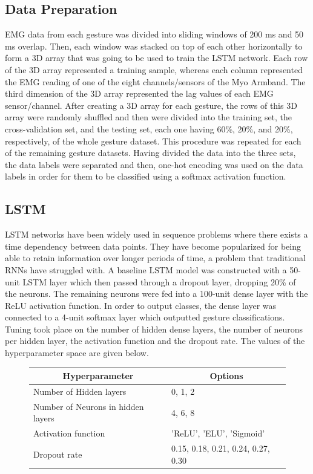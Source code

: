 \documentclass{article}
\begin{document}
\subsection*{Data Preparation}
EMG data from each gesture was divided into sliding windows of 200 ms and 50 ms overlap. Then, each window was stacked on top of each other horizontally to form a 3D array that was going to be used to train the LSTM network. Each row of the 3D array represented a training sample, whereas each column represented the EMG reading of one of the eight channels/sensors of the Myo Armband. The third dimension of the 3D array represented the lag values of each EMG sensor/channel. After creating a 3D array for each gesture, the rows of this 3D array were randomly shuffled and then were divided into the training set, the cross-validation set, and the testing set, each one having 60\%, 20\%, and 20\%, respectively, of the whole gesture dataset. This procedure was repeated for each of the remaining gesture datasets. Having divided the data into the three sets, the data labels were separated and then, one-hot encoding was used on the data labels in order for them to be classified using a softmax activation function. 

\subsection*{LSTM}
LSTM networks have been widely used in sequence problems where there exists a time dependency between data points. They have become popularized for being able to retain information over longer periods of time, a problem that traditional RNNs have struggled with. A baseline LSTM model was constructed with a 50-unit LSTM layer which then passed through a dropout layer, dropping 20\% of the neurons. The remaining neurons were fed into a 100-unit dense layer with the ReLU activation function. In order to output classes, the dense layer was connected to a 4-unit softmax layer which outputted gesture classifications. Tuning took place on the number of hidden dense layers, the number of neurons per hidden layer, the activation function and the dropout rate. The values of the hyperparameter space are given below.

\begin{figure}[!htb]
\caption{LSTM Hyperparameter Tuning Space}
\begin{table}[H]
\centering
\begin{tabular}{|l|l|}
\hline
\multicolumn{1}{|c|}{\textbf{Hyperparameter}} & \multicolumn{1}{c|}{\textbf{Options}} \\ \hline
Number of Hidden layers            & 0, 1, 2                            \\ \hline
Number of Neurons in hidden layers & 4, 6, 8                            \\ \hline
Activation function                & 'ReLU', 'ELU', 'Sigmoid'           \\ \hline
Dropout rate                       & 0.15, 0.18, 0.21, 0.24, 0.27, 0.30 \\ \hline
\end{tabular}
\end{table}
\end{figure}
\end{document}
